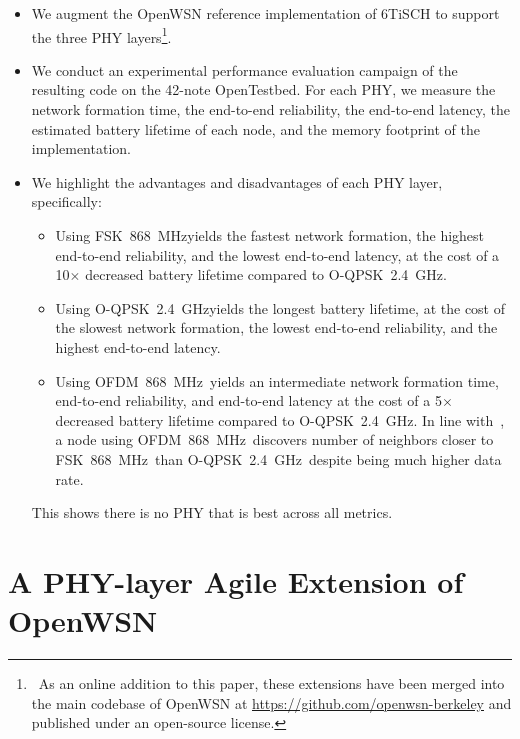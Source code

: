 \documentclass[sensors,article,submit,moreauthors,pdftex]{Definitions/mdpi}
\newcommand{\fsk}           {FSK~868~MHz}
\newcommand{\oqpsk}         {O-QPSK~2.4~GHz}
\newcommand{\ofdm}          {OFDM~868~MHz}
\begin{document}
\begin{itemize}
    \item We augment the OpenWSN reference implementation of 6TiSCH to support the three PHY layers\footnote{~As an online addition to this paper, these extensions have been merged into the main codebase of OpenWSN at \url{https://github.com/openwsn-berkeley} and published under an open-source license.}.
    \item We conduct an experimental performance evaluation campaign of the resulting code on the 42-note OpenTestbed.
        For each PHY, we measure 
            the network formation time,
            the end-to-end reliability,
            the end-to-end latency, 
            the estimated battery lifetime of each node, and
            the memory footprint of the implementation.
    \item We highlight the advantages and disadvantages of each PHY layer, specifically:
        \begin{itemize}
            \item Using \fsk yields
                the fastest network formation,
                the highest end-to-end reliability, and
                the lowest end-to-end latency,
                    at the cost of
                        a 10$\times$ decreased battery lifetime compared to \oqpsk.
            \item Using \oqpsk yields
                the longest battery lifetime,
                    at the cost of
                        the slowest network formation,
                        the lowest end-to-end reliability, and
                        the highest end-to-end latency.
            \item Using \ofdm\ yields
                an intermediate network formation time,
                end-to-end reliability, and
                end-to-end latency
                    at the cost of
                        a 5$\times$ decreased battery lifetime compared to \oqpsk.
                In line with~\cite{munoz18evaluation}, a node using \ofdm\ discovers number of neighbors closer to \fsk\ than \oqpsk\,
                    despite being much higher data rate.
        \end{itemize}
        This shows there is no PHY that is best across all metrics.
\end{itemize}

\section{A PHY-layer Agile Extension of OpenWSN}
\label{sec:openwsn}
\end{document}
